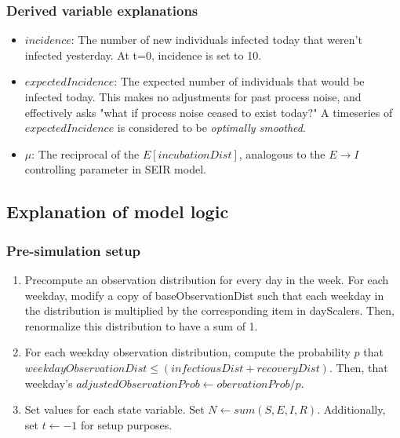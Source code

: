 \documentclass{article}
\begin{document}
\subsubsection{Derived variable explanations}
\begin{itemize}
    \item $incidence$: The number of new individuals infected today that weren't infected yesterday. At t=0, incidence is set to 10.
    \item $expectedIncidence$: The expected number of individuals that would be infected today. This makes no adjustments for past process noise, and effectively asks "what if process noise ceased to exist today?" A timeseries of $expectedIncidence$ is considered to be \textit{optimally smoothed}.
    \item $\mu$: The reciprocal of the $E[incubationDist]$, analogous to the $E \rightarrow I$ controlling parameter in SEIR model.
\end{itemize}

\subsection{Explanation of model logic}
\subsubsection{Pre-simulation setup}

\begin{enumerate}
    \item Precompute an observation distribution for every day in the week. For each weekday, modify a copy of baseObservationDist such that each weekday in the distribution is multiplied by the corresponding item in dayScalers. Then, renormalize this distribution to have a sum of 1.

    \item For each weekday observation distribution, compute the probability $p$ that $weekdayObservationDist \leq (infectiousDist+recoveryDist)$. Then, that weekday's $adjustedObservationProb \gets obervationProb/p$. 
    
    \item Set values for each state variable. Set $N \gets sum(S, E, I, R)$. Additionally, set $t \gets -1$ for setup purposes.

\end{enumerate}
\end{document}
